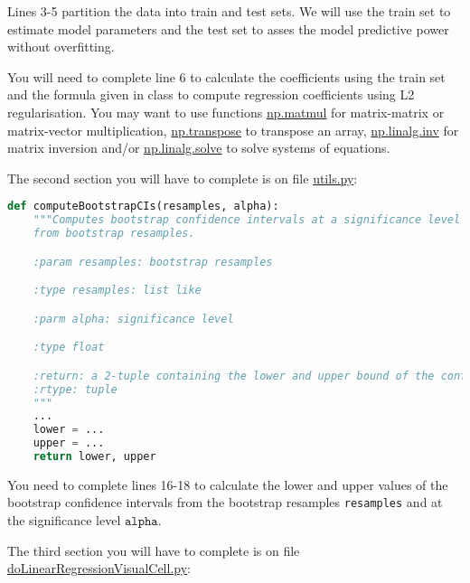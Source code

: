 \documentclass[12pt]{article}
\begin{document}
Lines 3-5 partition the data into train and test sets. We will use the train
set to estimate model parameters and the test set to asses the model predictive
power without overfitting.

You will need to complete line 6 to calculate the coefficients using the train
set and the formula given in class to compute regression coefficients using
L2 regularisation. You may want to use functions
\href{https://numpy.org/doc/stable/reference/generated/numpy.matmul.html}{np.matmul} for
matrix-matrix or matrix-vector multiplication,
\href{https://numpy.org/doc/stable/reference/generated/numpy.transpose.html}{np.transpose}
to transpose an array,
\href{https://numpy.org/doc/stable/reference/generated/numpy.linalg.inv.html}{np.linalg.inv}
for matrix inversion and/or
\href{https://numpy.org/doc/stable/reference/generated/numpy.linalg.solve.html}{np.linalg.solve}
to solve systems of equations.

The second section you will have to complete is on file
\href{https://github.com/joacorapela/neuroinformatics24/blob/master/worksheets/06_linearRegression/code/scripts/utils.py}{utils.py}:

\begin{lstlisting}[language=python]
def computeBootstrapCIs(resamples, alpha):
    """Computes bootstrap confidence intervals at a significance level alpha
    from bootstrap resamples.

    :param resamples: bootstrap resamples

    :type resamples: list like

    :parm alpha: significance level

    :type float

    :return: a 2-tuple containing the lower and upper bound of the confidence interval.
    :rtype: tuple
    """
    ...
    lower = ...
    upper = ...
    return lower, upper
	\end{lstlisting}

You need to complete lines 16-18 to calculate the lower and upper values of the bootstrap confidence intervals from the bootstrap resamples \texttt{resamples} and at the significance level $\texttt{alpha}$.

The third section you will have to complete is on file
\href{https://github.com/joacorapela/neuroinformatics24/blob/master/worksheets/06_linearRegression/code/scripts/https://github.com/joacorapela/neuroinformatics24/blob/master/worksheets/06_linearRegression/code/scripts/doLinearRegressionVisualCell.py}{doLinearRegressionVisualCell.py}:
\end{document}
